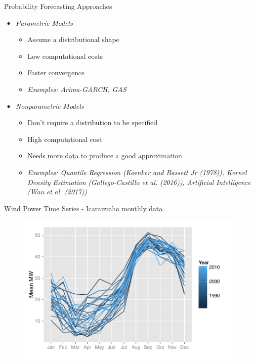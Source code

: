 \documentclass[11pt]{beamer}
\begin{document}
\begin{frame}{Probability Forecasting Approaches}

\begin{itemize}

\item
\emph{Parametric Models}

\begin{itemize}
	
	\item
	Assume a distributional shape
	\item
	Low computational costs
	\item
	Faster convergence
	\item
	\emph{Examples: Arima-GARCH, GAS}
\end{itemize}
\item
\emph{Nonparametric Models}

\begin{itemize}
	
	\item
	Don't require a distribution to be specified
	\item
	High computational cost
	\item
	Needs more data to produce a good approximation
	\item
	\emph{Examples: Quantile Regression (Koenker and Bassett Jr (1978)),
		Kernel Density Estimation (Gallego-Castillo et al. (2016)),
		Artificial Intelligence (Wan et al. (2017))}
\end{itemize}
\end{itemize}

\end{frame}

\begin{frame}{Wind Power Time Series - Icaraizinho monthly data}

\begin{figure}
\centering
\includegraphics[width=0.9\linewidth]{Images/icaraizinho-mensal}
\end{figure}

\end{frame}
\end{document}
